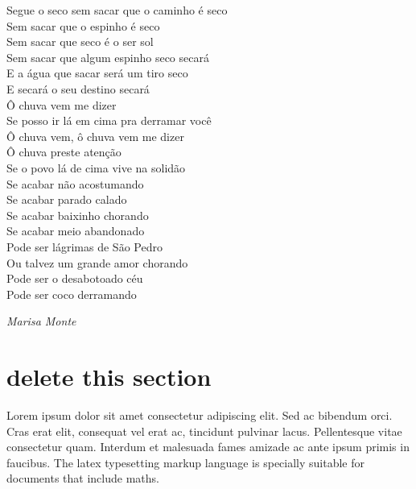 \documentclass[11pt, a4paper]{report}
\begin{document}
\epigraph{
Segue o seco sem sacar que o caminho é seco \\
Sem sacar que o espinho é seco\\
Sem sacar que seco é o ser sol\\
Sem sacar que algum espinho seco secará\\
E a água que sacar será um tiro seco\\
E secará o seu destino secará\\
Ô chuva vem me dizer\\
Se posso ir lá em cima pra derramar você\\
Ô chuva vem, ô chuva vem me dizer\\
Ô chuva preste atenção\\
Se o povo lá de cima vive na solidão\\
Se acabar não acostumando\\
Se acabar parado calado\\
Se acabar baixinho chorando\\
Se acabar meio abandonado\\
Pode ser lágrimas de São Pedro\\
Ou talvez um grande amor chorando\\
Pode ser o desabotoado céu\\
Pode ser coco derramando
}{\textit{Marisa Monte}}
\clearpage

\tableofcontents
\clearpage	
	
\listoffigures
\clearpage

\listoftables
\clearpage

\printglossary[type=\acronymtype]
\clearpage

\printnomenclature
\clearpage

\linenumbers %





\clearpage

\section*{delete this section}
\par Lorem ipsum dolor sit amet consectetur adipiscing elit. Sed ac bibendum orci. Cras erat elit, consequat vel erat ac, tincidunt pulvinar lacus. Pellentesque vitae consectetur quam. Interdum et malesuada fames \gls{amizade} ac ante ipsum primis in faucibus. 
The \Gls{latex} typesetting markup language is specially suitable 
for documents that include \gls{maths}. 
\end{document}
